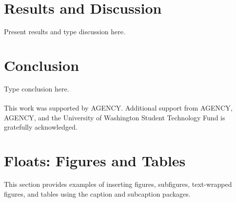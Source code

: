 \documentclass[12pt]{article}
\begin{document}
\section*{Results and Discussion}

Present results and type discussion here.

\section*{Conclusion}

Type conclusion here. \\[12pt]

 \\[12pt]
This work was supported by AGENCY. Additional support from AGENCY, AGENCY, and the University of Washington Student Technology Fund is gratefully acknowledged.

\newpage %

%
%
%
\newpage
\section*{Floats: Figures and Tables}

This section provides examples of inserting figures, subfigures, text-wrapped figures, and tables using the caption and subcaption packages. \\
\end{document}
